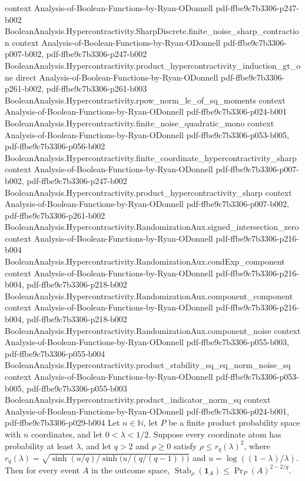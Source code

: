 \begin{theorem}
  {context}
  {Analysis-of-Boolean-Functions-by-Ryan-ODonnell}
  {pdf-ffbe9c7b3306-p247-b002}
\proofstep
  {BooleanAnalysis.Hypercontractivity.SharpDiscrete.finite_noise_sharp_contraction}
  {context}
  {Analysis-of-Boolean-Functions-by-Ryan-ODonnell}
  {pdf-ffbe9c7b3306-p007-b002,
    pdf-ffbe9c7b3306-p247-b002}
\proofstep
  {BooleanAnalysis.Hypercontractivity.product_hypercontractivity_induction_gt_one}
  {direct}
  {Analysis-of-Boolean-Functions-by-Ryan-ODonnell}
  {pdf-ffbe9c7b3306-p261-b002,
    pdf-ffbe9c7b3306-p261-b003}
\proofstep
  {BooleanAnalysis.Hypercontractivity.rpow_norm_le_of_sq_moments}
  {context}
  {Analysis-of-Boolean-Functions-by-Ryan-ODonnell}
  {pdf-ffbe9c7b3306-p024-b001}
\proofstep
  {BooleanAnalysis.Hypercontractivity.finite_noise_quadratic_mono}
  {context}
  {Analysis-of-Boolean-Functions-by-Ryan-ODonnell}
  {pdf-ffbe9c7b3306-p053-b005,
    pdf-ffbe9c7b3306-p056-b002}
\proofstep
  {BooleanAnalysis.Hypercontractivity.finite_coordinate_hypercontractivity_sharp}
  {context}
  {Analysis-of-Boolean-Functions-by-Ryan-ODonnell}
  {pdf-ffbe9c7b3306-p007-b002,
    pdf-ffbe9c7b3306-p247-b002}
\proofstep
  {BooleanAnalysis.Hypercontractivity.product_hypercontractivity_sharp}
  {context}
  {Analysis-of-Boolean-Functions-by-Ryan-ODonnell}
  {pdf-ffbe9c7b3306-p007-b002,
    pdf-ffbe9c7b3306-p261-b002}
\proofstep
  {BooleanAnalysis.Hypercontractivity.RandomizationAux.signed_intersection_zero}
  {context}
  {Analysis-of-Boolean-Functions-by-Ryan-ODonnell}
  {pdf-ffbe9c7b3306-p216-b004}
\proofstep
  {BooleanAnalysis.Hypercontractivity.RandomizationAux.condExp_component}
  {context}
  {Analysis-of-Boolean-Functions-by-Ryan-ODonnell}
  {pdf-ffbe9c7b3306-p216-b004,
    pdf-ffbe9c7b3306-p218-b002}
\proofstep
  {BooleanAnalysis.Hypercontractivity.RandomizationAux.component_component}
  {context}
  {Analysis-of-Boolean-Functions-by-Ryan-ODonnell}
  {pdf-ffbe9c7b3306-p216-b004,
    pdf-ffbe9c7b3306-p218-b002}
\proofstep
  {BooleanAnalysis.Hypercontractivity.RandomizationAux.component_noise}
  {context}
  {Analysis-of-Boolean-Functions-by-Ryan-ODonnell}
  {pdf-ffbe9c7b3306-p055-b003,
    pdf-ffbe9c7b3306-p055-b004}
\proofstep
  {BooleanAnalysis.Hypercontractivity.product_stability_sq_eq_norm_noise_sq}
  {context}
  {Analysis-of-Boolean-Functions-by-Ryan-ODonnell}
  {pdf-ffbe9c7b3306-p053-b005,
    pdf-ffbe9c7b3306-p055-b003}
\proofstep
  {BooleanAnalysis.Hypercontractivity.product_indicator_norm_sq}
  {context}
  {Analysis-of-Boolean-Functions-by-Ryan-ODonnell}
  {pdf-ffbe9c7b3306-p024-b001,
    pdf-ffbe9c7b3306-p029-b004}
Let $n\in\mathbb{N}$, let $P$ be a finite product probability space with $n$
coordinates, and let $0<\lambda<1/2$. Suppose every coordinate atom has probability at
least $\lambda$, and let $q>2$ and $\rho\ge 0$ satisfy $\rho\le r_q(\lambda)^2$, where
$r_q(\lambda)=\sqrt{\sinh(u/q)/\sinh\bigl(u/(q/(q-1))\bigr)}$ and
$u=\log((1-\lambda)/\lambda)$. Then for every event $A$ in the outcome space,
$\operatorname{Stab}_\rho(\mathbf{1}_A)\le\Pr_P(A)^{2-2/q}$.
\end{theorem}

